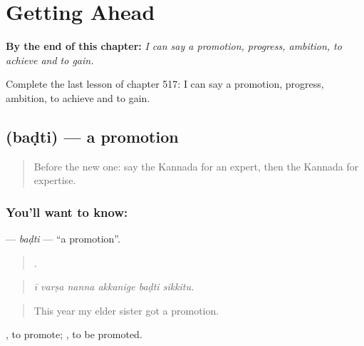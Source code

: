 
\chapter{Getting Ahead}
\label{ch:ka-getting-ahead}

\begin{chapteropening}
\textbf{By the end of this chapter:} \emph{I can say a promotion, progress, ambition, to achieve and to gain.}

Complete the last lesson of chapter 517: I can say a promotion, progress, ambition, to achieve and to gain.
\end{chapteropening}

\section[\texorpdfstring{\kn{ಬಡ್ತಿ} (baḍti)}{ಬಡ್ತಿ (baḍti)}]{ (baḍti) — a promotion}

\label{lesson:KA-C517-badti}



\begin{quote}
Before the new one: say the Kannada for an expert, then the Kannada for expertise.
\end{quote}

\subsection*{You'll want to know: }
\textbf{} — \emph{baḍti} — \textquotedblleft{}a promotion\textquotedblright{}.

\begin{quote}
     .
\end{quote}

\begin{quote}
\emph{ī varṣa nanna akkanige baḍti sikkitu.}
\end{quote}

\begin{quote}
This year my elder sister got a promotion.
\end{quote}

 , to promote;  , to be promoted.

